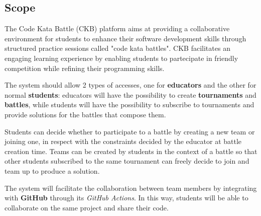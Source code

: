 \subsection{Scope}
The Code Kata Battle (CKB) platform aims at providing a collaborative environment for students to enhance their software development skills through structured practice sessions called "code kata battles". CKB facilitates an engaging learning experience by enabling students to partecipate in friendly competition while refining their programming skills.

The system should allow 2 types of accesses, one for \textbf{educators} and the other for normal \textbf{students}: educators will have the possibility to create \textbf{tournaments} and \textbf{battles}, while students will have the possibility to subscribe to tournaments and provide solutions for the battles that compose them.

Students can decide whether to participate to a battle by creating a new team or joining one, in respect with the constraints decided by the educator at battle creation time. Teams can be created by students in the context of a battle so that other students subscribed to the same tournament can freely decide to join and team up to produce a solution.

The system will facilitate the collaboration between team members by integrating with \textbf{GitHub} through its \emph{GitHub Actions}. In this way, students will be able to collaborate on the same project and share their code.

